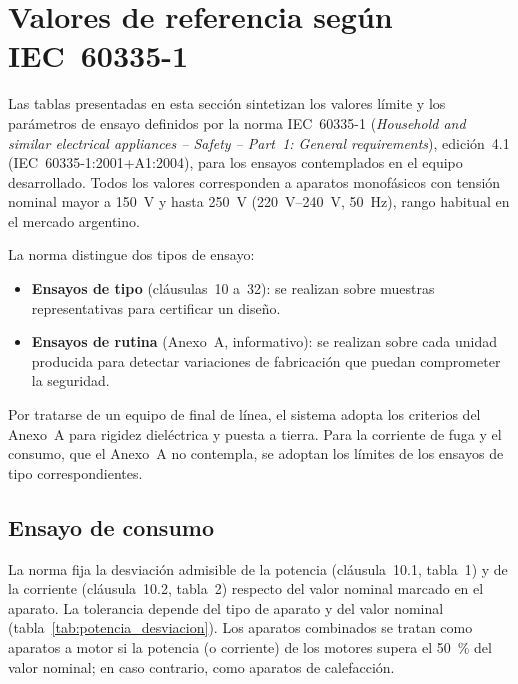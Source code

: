 \section{Valores de referencia según IEC~60335-1}
\label{anx:valores_referencia}

Las tablas presentadas en esta sección sintetizan los valores límite
y los parámetros de ensayo definidos por la norma IEC~60335-1
(\textit{Household and similar electrical appliances -- Safety --
Part~1: General requirements}), edición~4.1 (IEC~60335-1:2001+A1:2004),
para los ensayos contemplados en el equipo desarrollado.
Todos los valores corresponden a aparatos monofásicos con tensión nominal
mayor a \SI{150}{\volt} y hasta \SI{250}{\volt} (\SIrange{220}{240}{\volt},
\SI{50}{\hertz}), rango habitual en el mercado argentino.

La norma distingue dos tipos de ensayo:
\begin{itemize}
    \item \textbf{Ensayos de tipo} (cláusulas~10 a~32): se realizan sobre
          muestras representativas para certificar un diseño.
    \item \textbf{Ensayos de rutina} (Anexo~A, informativo): se realizan
          sobre cada unidad producida para detectar variaciones de
          fabricación que puedan comprometer la seguridad.
\end{itemize}
Por tratarse de un equipo de final de línea, el sistema adopta los
criterios del Anexo~A para rigidez dieléctrica y puesta a tierra.
Para la corriente de fuga y el consumo, que el Anexo~A no contempla,
se adoptan los límites de los ensayos de tipo correspondientes.

\subsection{Ensayo de consumo}
\label{subsec:tabla_potencia}

La norma fija la desviación admisible de la potencia
(cláusula~10.1, tabla~1) y de la corriente (cláusula~10.2, tabla~2)
respecto del valor nominal marcado en el aparato.
La tolerancia depende del tipo de aparato y del valor nominal
(tabla~\ref{tab:potencia_desviacion}).
Los aparatos combinados se tratan como aparatos a motor si la potencia
(o corriente) de los motores supera el \SI{50}{\percent} del valor nominal;
en caso contrario, como aparatos de calefacción.

